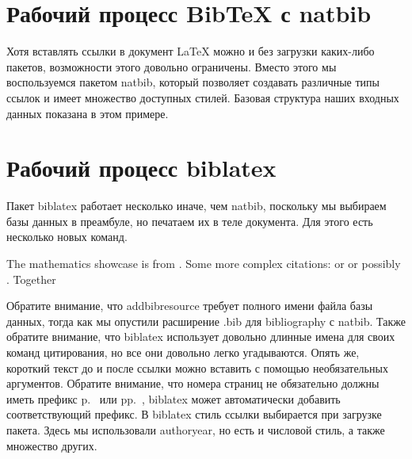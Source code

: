 \documentclass{article}
\begin{document}
  

  \section{Рабочий процесс BibTeX с natbib}
  \label{sec:overflowfix}
  

  Хотя вставлять ссылки в документ LaTeX можно и без загрузки каких-либо пакетов, возможности этого довольно ограничены. Вместо этого мы воспользуемся пакетом natbib, который
  позволяет создавать различные типы ссылок и имеет множество доступных стилей.
  Базовая структура наших входных данных показана в этом примере.

  \smallskip





  \section{Рабочий процесс biblatex}
  \label{sec:short}
  
  Пакет biblatex работает несколько иначе, чем natbib, поскольку мы выбираем
базы данных в преамбуле, но печатаем их в теле документа. Для этого есть несколько
новых команд.

  \smallskip

\begin{center}
The mathematics showcase is from \autocite{Graham1995}.
Some more complex citations: \parencite{Graham1995} or
\textcite{Thomas2008} or possibly .
\autocite[56]{Thomas2008}
\autocite[See][45-48]{Graham1995}
Together \autocite{Thomas2008,Graham1995}
\printbibliography
\end{center}

  \smallskip

  Обратите внимание, что addbibresource требует полного имени файла базы данных, тогда как мы
опустили расширение .bib для bibliography с natbib. Также обратите внимание, что biblatex
использует довольно длинные имена для своих команд цитирования, но все они довольно легко
угадываются.
Опять же, короткий текст до и после ссылки можно вставить с помощью необязательных
аргументов. Обратите внимание, что номера страниц не обязательно должны иметь префикс p.~ или pp.~,
biblatex может автоматически добавить соответствующий префикс.
В biblatex стиль ссылки выбирается при загрузке пакета. Здесь мы
использовали authoryear, но есть и числовой стиль, а также множество других.
\end{document}
